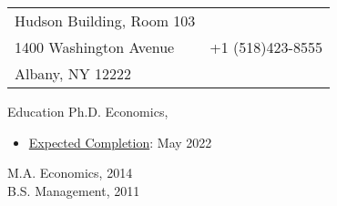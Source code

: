 \documentclass{resume_liang} %
\begin{document}
	
\begin{tabu} to \linewidth {X[l]X[r]}
Hudson Building, Room 103  & \href{mailto:lfu@albany.edu}{\color{blue}{lfu@albany.edu}} \\
1400 Washington Avenue     & +1 (518)423-8555 \\
Albany, NY 12222           & \href{https://liang-fu-econ.github.io/website/}{\color{blue}{https://liang-fu-econ.github.io/website/}}
\end{tabu}
\bigskip \bigskip




\begin{rSection}{Education}
Ph.D. Economics, {\bf \href{https://www.albany.edu/economics}{\color{black}{University at Albany, SUNY}}}  \hfill {} \vspace{0.1cm}              
  \begin{itemize}
  	\item[] \underline{Expected Completion}: May 2022
  \end{itemize}
M.A. Economics, {\bf \href{http://en.cufe.edu.cn/}{\color{black}{Central University of Finance and Economics}}} \hfill {2014} 
\vspace{0.1cm} \\
B.S. Management, {\bf \href{https://english.qdu.edu.cn/}{\color{black}{Qingdao University}}} \hfill {2011} 
\vspace{0.1cm} \\
\end{rSection}
\bigskip  
\end{document}
